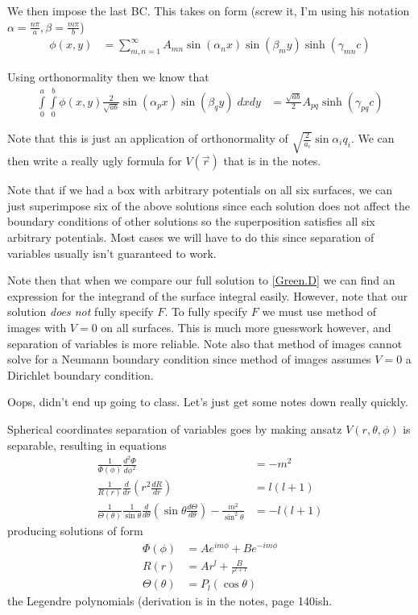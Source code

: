 \documentclass[10pt]{report}
\newcommand{\rd}[2]{\frac{d#1}{d#2}}
\newcommand{\rtd}[2]{\frac{d^2#1}{d#2^2}}
\begin{document}
We then impose the last BC. This takes on form (screw it, I'm using his notation $\alpha = \frac{n\pi}{a}, \beta = \frac{m\pi}{b}$)
\begin{align}
    \phi(x,y) &= \sum_{m,n = 1}^{\infty} A_{mn}\sin(\alpha_nx)\sin\left( \beta_my \right)\sinh(\gamma_{mn}c)
\end{align}

Using orthonormality then we know that
\begin{align}
    \displaystyle\int\limits_{0}^{a}\displaystyle\int\limits_{0}^{b}\phi(x,y)\frac{2}{\sqrt{ab}}\sin (\alpha_p x)\sin(\beta_q y)\;dxdy &= \frac{\sqrt{ab}}{2}A_{pq}\sinh(\gamma_{pq}c)
\end{align}

Note that this is just an application of orthonormality of $\sqrt{\frac{2}{a_i}}\sin \alpha_i q_i$. We can then write a really ugly formula for $V(\vec{r})$ that is in the notes.

Note that if we had a box with arbitrary potentials on all six surfaces, we can just superimpose six of the above solutions since each solution does not affect the boundary conditions of other solutions so the superposition satisfies all six arbitrary potentials. Most cases we will have to do this since separation of variables usually isn't guaranteed to work. 

Note then that when we compare our full solution to \eqref{Green.D} we can find an expression for the integrand of the surface integral easily. However, note that our solution \emph{does not} fully specify $F$. To fully specify $F$ we must use method of images with $V=0$ on all surfaces. This is much more guesswork however, and separation of variables is more reliable. Note also that method of images cannot solve for a Neumann boundary condition since method of images assumes $V=0$ a Dirichlet boundary condition.

Oops, didn't end up going to class. Let's just get some notes down really quickly.

Spherical coordinates separation of variables goes by making ansatz $V(r,\theta,\phi)$ is separable, resulting in equations
\begin{align}
    \frac{1}{\Phi(\phi)}\rtd{\Phi}{\phi} &= -m^2\\
    \frac{1}{R(r)}\rd{}{r}\left( r^2 \rd{R}{r} \right) &= l(l+1)\\
    \frac{1}{\Theta(\theta)}\frac{1}{\sin\theta}\rd{}{\theta}\left( \sin\theta \rd{\Theta}{\theta} \right)- \frac{m^2}{\sin^2\theta} &= -l(l+1)
\end{align}
producing solutions of form
\begin{align}
    \Phi(\phi) &= Ae^{im\phi} + Be^{-im\phi}\\
    R(r) &= Ar^{l} + \frac{B}{r^{l+1}}\\
    \Theta(\theta) &= P_l(\cos\theta)
\end{align}
the Legendre polynomials (derivation is in the notes, page 140ish.
\end{document}
